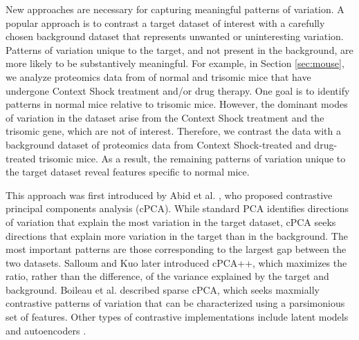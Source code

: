 \documentclass[10pt]{article}
\begin{document}
New approaches are necessary for capturing meaningful patterns of variation. A popular approach is to contrast a target dataset of interest with a carefully chosen background dataset that represents unwanted or uninteresting variation. Patterns of variation unique to the target, and not present in the background, are more likely to be substantively meaningful.
For example, in Section \ref{sec:mouse}, we analyze proteomics data from of normal and trisomic mice that have undergone Context Shock treatment and/or drug therapy. One goal is to identify patterns in normal mice relative to trisomic mice. However, the dominant modes of variation in the dataset arise from the Context Shock treatment and the trisomic gene, which are not of interest. Therefore, we contrast the data with a background dataset of proteomics data from Context Shock-treated and drug-treated trisomic mice. As a result, the remaining patterns of variation unique to the target dataset reveal features specific to normal mice.

This approach was first introduced by Abid et al. \cite{Abid}, who proposed contrastive principal components analysis (cPCA). While standard PCA identifies directions of variation that explain the most variation in the target dataset, cPCA seeks directions that explain more variation in the target than in the background. The most important patterns are those corresponding to the largest gap between the two datasets. Salloum and Kuo \cite{Salloum} later introduced cPCA++, which maximizes the ratio, rather than the difference, of the variance explained by the target and background. Boileau et al. \cite{Boileau} described sparse cPCA, which seeks maxmially contrastive patterns of variation that can be characterized using a parsimonious set of features. Other types of contrastive implementations include latent models \cite{severson2019unsupervised} and autoencoders \cite{cautoencoder}.
\end{document}
